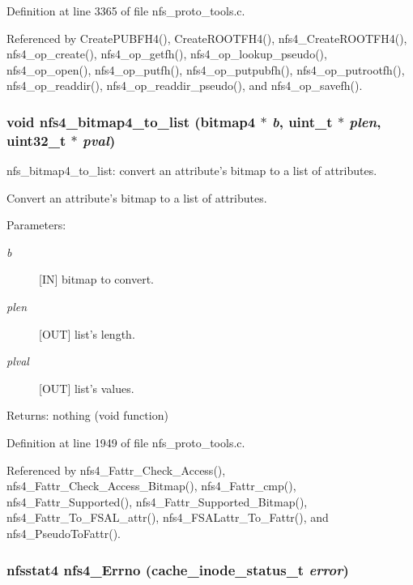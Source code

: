 Definition at line 3365 of file nfs\_\-proto\_\-tools.c.

Referenced by Create\-PUBFH4(), Create\-ROOTFH4(), nfs4\_\-Create\-ROOTFH4(), nfs4\_\-op\_\-create(), nfs4\_\-op\_\-getfh(), nfs4\_\-op\_\-lookup\_\-pseudo(), nfs4\_\-op\_\-open(), nfs4\_\-op\_\-putfh(), nfs4\_\-op\_\-putpubfh(), nfs4\_\-op\_\-putrootfh(), nfs4\_\-op\_\-readdir(), nfs4\_\-op\_\-readdir\_\-pseudo(), and nfs4\_\-op\_\-savefh().
\subsubsection{\setlength{\rightskip}{0pt plus 5cm}void nfs4\_\-bitmap4\_\-to\_\-list (bitmap4 $\ast$ {\em b}, uint\_\-t $\ast$ {\em plen}, uint32\_\-t $\ast$ {\em pval})}\label{nfs__proto__tools_8c_a16}


nfs\_\-bitmap4\_\-to\_\-list: convert an attribute's bitmap to a list of attributes.

Convert an attribute's bitmap to a list of attributes.

\begin{Desc}
\item[Parameters:]
\begin{description}
\item[{\em b}][IN] bitmap to convert. \item[{\em plen}][OUT] list's length. \item[{\em plval}][OUT] list's values.\end{description}
\end{Desc}
\begin{Desc}
\item[Returns:]nothing (void function) \end{Desc}


Definition at line 1949 of file nfs\_\-proto\_\-tools.c.

Referenced by nfs4\_\-Fattr\_\-Check\_\-Access(), nfs4\_\-Fattr\_\-Check\_\-Access\_\-Bitmap(), nfs4\_\-Fattr\_\-cmp(), nfs4\_\-Fattr\_\-Supported(), nfs4\_\-Fattr\_\-Supported\_\-Bitmap(), nfs4\_\-Fattr\_\-To\_\-FSAL\_\-attr(), nfs4\_\-FSALattr\_\-To\_\-Fattr(), and nfs4\_\-Pseudo\-To\-Fattr().
\subsubsection{\setlength{\rightskip}{0pt plus 5cm}nfsstat4 nfs4\_\-Errno (cache\_\-inode\_\-status\_\-t {\em error})}\label{nfs__proto__tools_8c_a26}


